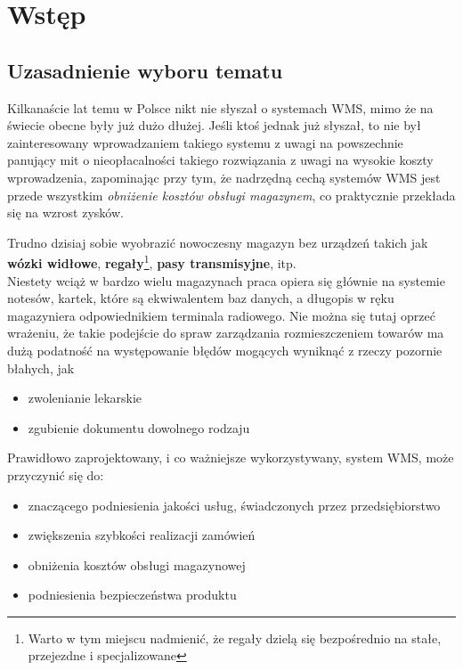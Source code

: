 \chapter{Wstęp}
\label{c1:c1}

\section{Uzasadnienie wyboru tematu}
	Kilkanaście lat temu w Polsce nikt nie słyszał o systemach WMS, mimo że na świecie
	obecne były już dużo dłużej. Jeśli ktoś jednak już słyszał, to nie był zainteresowany
	wprowadzaniem takiego systemu z uwagi na powszechnie panujący mit o nieopłacalności takiego
	rozwiązania z uwagi na wysokie koszty wprowadzenia, zapominając przy tym, że nadrzędną cechą systemów WMS jest
	przede wszystkim \emph{obniżenie kosztów obsługi magazynem}, co praktycznie przekłada się na wzrost 
	zysków.
	
	Trudno dzisiaj sobie wyobrazić nowoczesny magazyn bez urządzeń takich jak \textbf{wózki widłowe}, 
	\textbf{regały}\footnote{Warto w tym miejscu nadmienić, że regały dzielą się bezpośrednio na stałe,
	przejezdne i specjalizowane}, \textbf{pasy transmisyjne}, itp. \\ 
	Niestety wciąż w bardzo wielu magazynach praca opiera się głównie na systemie notesów, kartek, które 
	są ekwiwalentem baz danych, a długopis w ręku magazyniera odpowiednikiem terminala radiowego. Nie 
	można się tutaj oprzeć wrażeniu, że takie podejście do spraw zarządzania rozmieszczeniem towarów
	ma dużą podatność na występowanie błędów mogących wyniknąć z rzeczy pozornie błahych, jak
	\begin{itemize}
		\item zwolenianie lekarskie
		\item zgubienie dokumentu dowolnego rodzaju
	\end{itemize}
	
	Prawidłowo zaprojektowany, i co ważniejsze wykorzystywany, system WMS, może przyczynić się do:
	\begin{itemize}
		\item znaczącego podniesienia jakości usług, świadczonych przez przedsiębiorstwo
		\item zwiększenia szybkości realizacji zamówień
		\item obniżenia kosztów obsługi magazynowej
		\item podniesienia bezpieczeństwa produktu
	\end{itemize}
	

